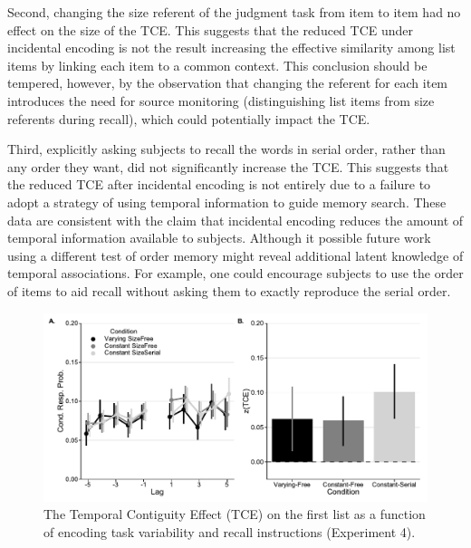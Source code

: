 \documentclass[man,natbib,floatsintext]{apa6} %
\begin{document}
Second, changing the size referent of the judgment task from item to item had no effect on the size of the TCE. This suggests that the reduced TCE under incidental encoding is not the result increasing the effective similarity among list items by linking each item to a common context. This conclusion should be tempered, however, by the observation that changing the referent for each item introduces the need for source monitoring (distinguishing list items from size referents during recall), which could potentially impact the TCE.  

Third, explicitly asking subjects to recall the words in serial order, rather than any order they want, did not significantly increase the TCE. This suggests that the reduced TCE after incidental encoding is not entirely due to a failure to adopt a strategy of using temporal information to guide memory search. These data are consistent with the claim that incidental encoding reduces the amount of temporal information available to subjects. Although it possible future work using a different test of order memory might reveal additional latent knowledge of temporal associations. For example, one could encourage subjects to use the order of items to aid recall without asking them to exactly reproduce the serial order. %


\begin{figure}%
\includegraphics{figures/E4_crp_list1.pdf}
\caption{The Temporal Contiguity Effect (TCE) on the first list as a function of encoding task variability and recall instructions (Experiment 4).\paneltext}
\label{e4_l1_crp}
\end{figure}

\color{black}
\end{document}
